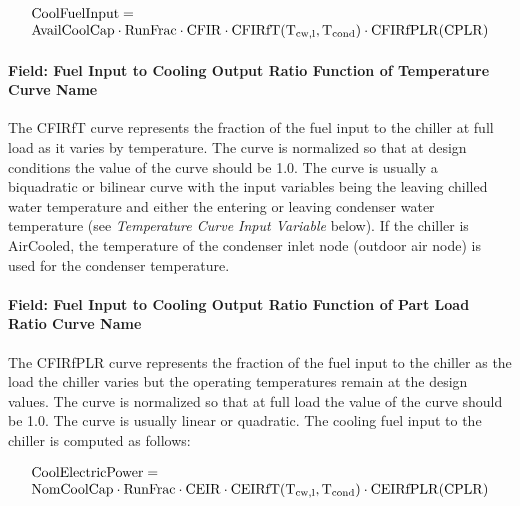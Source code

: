 \begin{equation}
\begin{array}{l}
\rm{CoolFuelInput} = \\
\rm{AvailCoolCap} \cdot \rm{RunFrac} \cdot \rm{CFIR} \cdot \rm{CFIRfT}( T_{cw,l}, {T_{\rm{cond}}}) \cdot \rm{CFIRfPLR}( \rm{CPLR} )
\end{array}
\end{equation}

\paragraph{Field: Fuel Input to Cooling Output Ratio Function of Temperature Curve Name}\label{field-fuel-input-to-cooling-output-ratio-function-of-temperature-curve-name}

The CFIRfT curve represents the fraction of the fuel input to the chiller at full load as it varies by temperature. The curve is normalized so that at design conditions the value of the curve should be 1.0. The curve is usually a biquadratic or bilinear curve with the input variables being the leaving chilled water temperature and either the entering or leaving condenser water temperature (see \emph{Temperature Curve Input Variable} below). If the chiller is AirCooled, the temperature of the condenser inlet node (outdoor air node) is used for the condenser temperature.

\paragraph{Field: Fuel Input to Cooling Output Ratio Function of Part Load Ratio Curve Name}\label{field-fuel-input-to-cooling-output-ratio-function-of-part-load-ratio-curve-name}

The CFIRfPLR curve represents the fraction of the fuel input to the chiller as the load the chiller varies but the operating temperatures remain at the design values. The curve is normalized so that at full load the value of the curve should be 1.0. The curve is usually linear or quadratic. The cooling fuel input to the chiller is computed as follows:

\begin{equation}
\begin{array}{l}
\rm{CoolElectricPower} = \\
\rm{NomCoolCap} \cdot \rm{RunFrac} \cdot \rm{CEIR} \cdot \rm{CEIRfT}(T_{cw,l}, T_{cond}) \cdot \rm{CEIRfPLR}(\rm{CPLR})
\end{array}
\end{equation}

